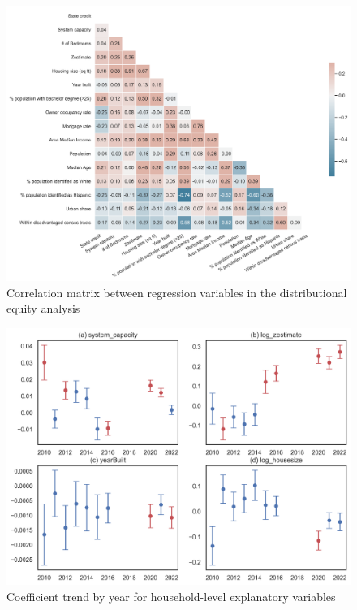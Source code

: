 \documentclass[12pt,twoside,letterpaper]{article}
\begin{document}
\begin{figure}[H]
    \centering
\includegraphics[width=1\textwidth]{figures/corr_matrix.png}
    \caption{Correlation matrix between regression variables in the distributional equity analysis}
    \label{fig:corr_matrix}
\end{figure}

\begin{figure}[H]
    \centering
\includegraphics[width=1\textwidth]{figures/key_coefficient_trend.png}
    \caption{Coefficient trend by year for household-level explanatory variables}
    \label{fig:coefficient_trend}
\end{figure}
\end{document}
